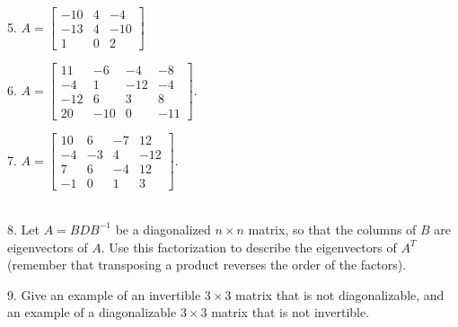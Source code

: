 \documentclass{article}
\begin{document}
5. $A = \left[\begin{array}{ccc} -10& 4& -4 \\ -13& 4& -10 \\ 1& 0& 2 \end{array}\right]$

6. $A = \left[\begin{array}{cccc} 11& -6& -4& -8 \\ -4& 1& -12& -4 \\ -12& 6& 3& 8 \\ 20& -10& 0& -11 \end{array}\right]$.

7. $A = \left[\begin{array}{cccc} 10& 6& -7& 12 \\ -4& -3& 4& -12 \\ 7& 6& -4& 12 \\ -1& 0& 1& 3 \end{array}\right]$.

~\\

8. Let $A = BDB^{-1}$ be a diagonalized $n \times n$ matrix, so that the columns of $B$ are eigenvectors of $A$. Use this factorization to describe the eigenvectors of $A^T$ (remember that transposing a product reverses the order of the factors).

9. Give an example of an invertible $3 \times 3$ matrix that is not diagonalizable, and an example of a diagonalizable $3 \times 3$ matrix that is not invertible.
\end{document}
